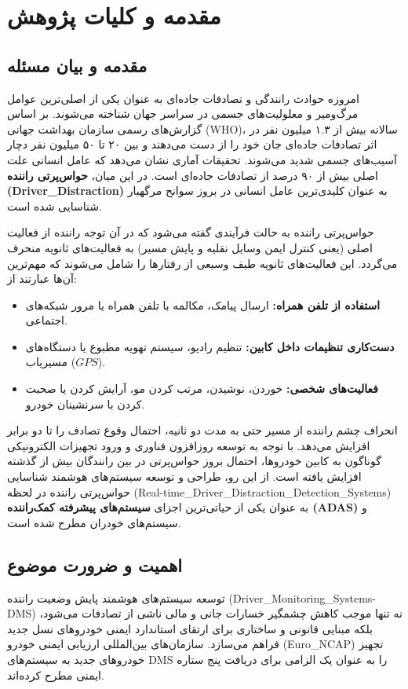 \documentclass{report}
\begin{document}
    \tableofcontents
    \clearpage
    
 	
 	
 	\chapter{مقدمه و کلیات پژوهش}
 	
 	\section{مقدمه و بیان مسئله}
 	امروزه حوادث رانندگی و تصادفات جاده‌ای به عنوان یکی از اصلی‌ترین عوامل مرگ‌ومیر و معلولیت‌های جسمی در سراسر جهان شناخته می‌شوند. بر اساس گزارش‌های رسمی سازمان بهداشت جهانی (WHO)، سالانه بیش از ۱.۳ میلیون نفر در اثر تصادفات جاده‌ای جان خود را از دست می‌دهند و بین ۲۰ تا ۵۰ میلیون نفر دچار آسیب‌های جسمی شدید می‌شوند. تحقیقات آماری نشان می‌دهد که عامل انسانی علت اصلی بیش از ۹۰ درصد از تصادفات جاده‌ای است. در این میان، \textbf{حواس‌پرتی راننده (Driver\_Distraction)} به عنوان کلیدی‌ترین عامل انسانی در بروز سوانح مرگهبار شناسایی شده است.
 	
 	حواس‌پرتی راننده به حالت فرآیندی گفته می‌شود که در آن توجه راننده از فعالیت اصلی (یعنی کنترل ایمن وسایل نقلیه و پایش مسیر) به فعالیت‌های ثانویه منحرف می‌گردد. این فعالیت‌های ثانویه طیف وسیعی از رفتارها را شامل می‌شوند که مهم‌ترین آن‌ها عبارتند از:
 	\begin{itemize}
 		\item \textbf{استفاده از تلفن همراه:} ارسال پیامک، مکالمه با تلفن همراه یا مرور شبکه‌های اجتماعی.
 		\item \textbf{دست‌کاری تنظیمات داخل کابین:} تنظیم رادیو، سیستم تهویه مطبوع یا دستگاه‌های مسیریاب ($GPS$).
 		\item \textbf{فعالیت‌های شخصی:} خوردن، نوشیدن، مرتب کردن مو، آرایش کردن یا صحبت کردن با سرنشینان خودرو.
 	\end{itemize}
 	
 	انحراف چشم راننده از مسیر حتی به مدت دو ثانیه، احتمال وقوع تصادف را تا دو برابر افزایش می‌دهد. با توجه به توسعه روزافزون فناوری و ورود تجهیزات الکترونیکی گوناگون به کابین خودروها، احتمال بروز حواس‌پرتی در بین رانندگان بیش از گذشته افزایش یافته است. از این رو، طراحی و توسعه سیستم‌های هوشمند شناسایی حواس‌پرتی راننده در لحظه (Real-time\_Driver\_Distraction\_Detection\_Systems) به عنوان یکی از حیاتی‌ترین اجزای \textbf{سیستم‌های پیشرفته کمک‌راننده (ADAS)} و سیستم‌های خودران مطرح شده است.
 	
 	\section{اهمیت و ضرورت موضوع}
 	توسعه سیستم‌های هوشمند پایش وضعیت راننده (Driver\_Monitoring\_Systems-DMS) نه تنها موجب کاهش چشمگیر خسارات جانی و مالی ناشی از تصادفات می‌شود، بلکه مبنایی قانونی و ساختاری برای ارتقای استاندارد ایمنی خودروهای نسل جدید فراهم می‌سازد. سازمان‌های بین‌المللی ارزیابی ایمنی خودرو (Euro\_NCAP) تجهیز خودروهای جدید به سیستم‌های DMS را به عنوان یک الزامی برای دریافت پنج ستاره ایمنی مطرح کرده‌اند.
 	
\end{document}
